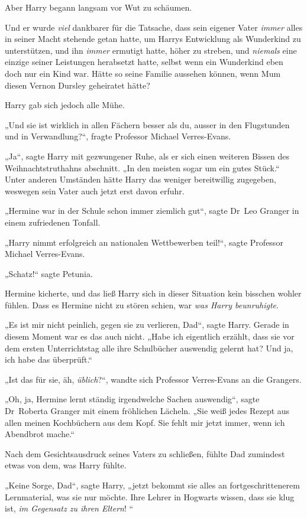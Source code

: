 {Aber Harry begann langsam vor Wut zu schäumen.

Und er wurde \emph{viel} dankbarer für die Tatsache, dass sein eigener Vater \emph{immer} alles in seiner Macht stehende getan hatte, um Harrys Entwicklung als Wunderkind zu unterstützen, und ihn \emph{immer} ermutigt hatte, höher zu streben, und \emph{niemals} eine einzige seiner Leistungen herabsetzt hatte, selbst wenn ein Wunderkind eben doch nur ein Kind war. Hätte so seine Familie aussehen können, wenn Mum diesen Vernon Dursley geheiratet hätte?

Harry gab sich jedoch alle Mühe.

„Und sie ist wirklich in allen Fächern besser als du, ausser in den Flugstunden und in Verwandlung?“, fragte Professor Michael Verres-Evans.

„Ja“, sagte Harry mit gezwungener Ruhe, als er sich einen weiteren Bissen des Weihnachtstruthahns abschnitt. „In den meisten sogar um ein gutes Stück.“ Unter anderen Umständen hätte Harry das weniger bereitwillig zugegeben, weswegen sein Vater auch jetzt erst davon erfuhr.

„Hermine war in der Schule schon immer ziemlich gut“, sagte Dr~Leo Granger in einem zufriedenen Tonfall.

„Harry nimmt erfolgreich an nationalen Wettbewerben teil!“, sagte Professor Michael Verres-Evans.

„Schatz!“ sagte Petunia.

Hermine kicherte, und das ließ Harry sich in dieser Situation kein bisschen wohler fühlen. Dass es Hermine nicht zu stören schien, war \emph{was Harry beunruhigte}.

„Es ist mir nicht peinlich, gegen sie zu verlieren, Dad“, sagte Harry. Gerade in diesem Moment war es das auch nicht. „Habe ich eigentlich erzählt, dass sie vor dem ersten Unterrichtstag alle ihre Schulbücher auswendig gelernt hat? Und ja, ich habe das überprüft.“

„Ist das für sie, äh, \emph{üblich}?“, wandte sich Professor Verres-Evans an die Grangers.

„Oh, ja, Hermine lernt ständig irgendwelche Sachen auswendig“, sagte Dr~Roberta Granger mit einem fröhlichen Lächeln. „Sie weiß jedes Rezept aus allen meinen Kochbüchern aus dem Kopf. Sie fehlt mir jetzt immer, wenn ich Abendbrot mache.“

Nach dem Gesichtsausdruck seines Vaters zu schließen, fühlte Dad zumindest etwas von dem, was Harry fühlte.

„Keine Sorge, Dad“, sagte Harry, „jetzt bekommt sie alles an fortgeschrittenerem Lernmaterial, was sie nur möchte. Ihre Lehrer in Hogwarts wissen, dass sie klug ist, \emph{im Gegensatz zu ihren Eltern}! “

}
